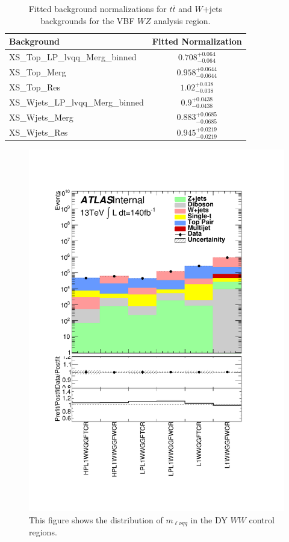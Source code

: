 \begin{table}
\begin{tabular}{|l|c|}
\hline
Background & Fitted Normalization \\\hline
XS\_Top\_LP\_lvqq\_Merg\_binned & $0.708^{+0.064}_{-0.064}$ \\\hline
XS\_Top\_Merg & $0.958^{+0.0644}_{-0.0644}$ \\\hline
XS\_Top\_Res & $1.02^{+0.038}_{-0.038}$ \\\hline
XS\_Wjets\_LP\_lvqq\_Merg\_binned & $0.9^{+0.0438}_{-0.0438}$ \\\hline
XS\_Wjets\_Merg & $0.883^{+0.0685}_{-0.0685}$ \\\hline
XS\_Wjets\_Res & $0.945^{+0.0219}_{-0.0219}$ \\\hline
\end{tabular}
\caption{Fitted background normalizations for $t\bar{t}$ and $W$+jets backgrounds for the VBF $WZ$ analysis region.}
\label{tbl:hvtwzvbf_norm}
\end{table}


\begin{figure}[h!]
  \centering
  \includegraphics[width=\hsize]{figures/results/HVTWW/PlotyieldTable_postfit.pdf}
 \caption{This figure shows the distribution of $m_{\ell\nu qq}$ in the DY $WW$ control regions.} 
  \label{fig:hvtww_cr_postfit}
\end{figure} 
\FloatBarrier

